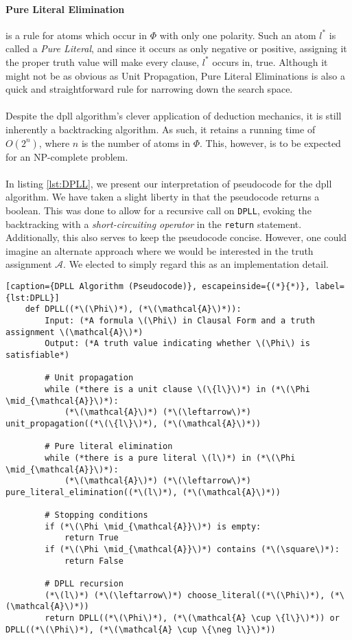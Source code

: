 \paragraph{Pure Literal Elimination} is a rule for atoms which occur in \(\Phi\) with only one polarity. Such an atom \(l^{*}\) is called a \emph{Pure Literal}, and since it occurs as only negative or positive, assigning it the proper truth value will make every clause, \(l^{*}\) occurs in, true. Although it might not be as obvious as Unit Propagation, Pure Literal Eliminations is also a quick and straightforward rule for narrowing down the search space.
\\
\\
Despite the \acrshort{dpll} algorithm's clever application of deduction mechanics, it is still inherently a backtracking algorithm. As such, it retains a running time of \(O(2^n)\), where \(n\) is the number of atoms in \(\Phi\). This, however, is to be expected for an NP-complete problem.
\\
\\
In listing \ref{lst:DPLL}, we present our interpretation of pseudocode for the \acrshort{dpll} algorithm. We have taken a slight liberty in that the pseudocode returns a boolean. This was done to allow for a recursive call on \texttt{DPLL}, evoking the backtracking with a \emph{short-circuiting operator} in the \texttt{return} statement. Additionally, this also serves to keep the pseudocode concise. However, one could imagine an alternate approach where we would be interested in the truth assignment \(\mathcal{A}\). We elected to simply regard this as an implementation detail.

\begin{lstlisting}[caption={DPLL Algorithm (Pseudocode)}, escapeinside={(*}{*)}, label={lst:DPLL}]
    def DPLL((*\(\Phi\)*), (*\(\mathcal{A}\)*)):
        Input: (*A formula \(\Phi\) in Clausal Form and a truth assignment \(\mathcal{A}\)*)
        Output: (*A truth value indicating whether \(\Phi\) is satisfiable*)

        # Unit propagation
        while (*there is a unit clause \(\{l\}\)*) in (*\(\Phi \mid_{\mathcal{A}}\)*):
            (*\(\mathcal{A}\)*) (*\(\leftarrow\)*) unit_propagation((*\(\{l\}\)*), (*\(\mathcal{A}\)*))

        # Pure literal elimination
        while (*there is a pure literal \(l\)*) in (*\(\Phi \mid_{\mathcal{A}}\)*):
            (*\(\mathcal{A}\)*) (*\(\leftarrow\)*) pure_literal_elimination((*\(l\)*), (*\(\mathcal{A}\)*))

        # Stopping conditions
        if (*\(\Phi \mid_{\mathcal{A}}\)*) is empty:
            return True
        if (*\(\Phi \mid_{\mathcal{A}}\)*) contains (*\(\square\)*):
            return False

        # DPLL recursion
        (*\(l\)*) (*\(\leftarrow\)*) choose_literal((*\(\Phi\)*), (*\(\mathcal{A}\)*))
        return DPLL((*\(\Phi\)*), (*\(\mathcal{A} \cup \{l\}\)*)) or DPLL((*\(\Phi\)*), (*\(\mathcal{A} \cup \{\neg l\}\)*))
\end{lstlisting}

